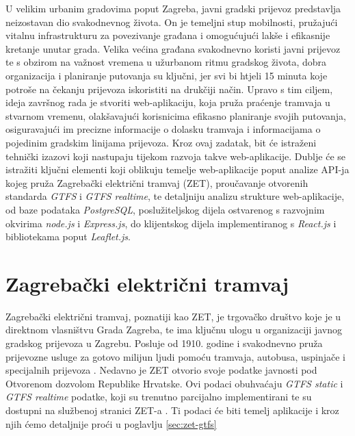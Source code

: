 \documentclass[zavrsnirad]{fer}
\begin{document}
U velikim urbanim gradovima poput Zagreba, javni gradski prijevoz predstavlja neizostavan dio svakodnevnog života. On je temeljni stup mobilnosti, pružajući vitalnu infrastrukturu za povezivanje građana i omogućujući lakše i efikasnije kretanje unutar grada. Velika većina građana svakodnevno koristi javni prijevoz te s obzirom na važnost vremena u užurbanom ritmu gradskog života, dobra organizacija i planiranje putovanja su ključni, jer svi bi htjeli 15 minuta koje potroše na čekanju prijevoza iskoristiti na drukčiji način. Upravo s tim ciljem, ideja završnog rada je stvoriti web-aplikaciju, koja pruža praćenje tramvaja u stvarnom vremenu, olakšavajući korisnicima efikasno planiranje svojih putovanja, osiguravajući im precizne informacije o dolasku tramvaja i informacijama o pojedinim gradskim linijama prijevoza. Kroz ovaj zadatak, bit će istraženi tehnički izazovi koji nastupaju tijekom razvoja takve web-aplikacije. Dublje će se istražiti ključni elementi koji oblikuju temelje web-aplikacije poput analize API-ja kojeg pruža Zagrebački električni tramvaj (ZET), proučavanje otvorenih standarda \textit{GTFS} i \textit{GTFS realtime}, te detaljniju analizu strukture web-aplikacije, od baze podataka \textit{PostgreSQL}, poslužiteljskog dijela ostvarenog s razvojnim okvirima \textit{node.js} i \textit{Express.js}, do klijentskog dijela implementiranog s \textit{React.js} i bibliotekama poput \textit{Leaflet.js}.







\chapter{Zagrebački električni tramvaj}
Zagrebački električni tramvaj, poznatiji kao ZET, je trgovačko društvo koje je u direktnom
vlasništvu Grada Zagreba, te ima ključnu ulogu u organizaciji javnog gradskog prijevoza u Zagrebu.
Posluje od 1910. godine i svakodnevno pruža prijevozne usluge za gotovo milijun ljudi pomoću
tramvaja, autobusa, uspinjače i specijalnih prijevoza \cite{ZET}.
Nedavno je ZET otvorio svoje podatke javnosti pod Otvorenom dozvolom Republike Hrvatske. Ovi podaci obuhvaćaju \textit{GTFS static} i \textit{GTFS realtime} podatke, koji su trenutno parcijalno implementirani te su dostupni na službenoj stranici ZET-a \cite{ZET-GTFS}.
Ti podaci će biti temelj aplikacije i kroz njih ćemo detaljnije proći u poglavlju \ref{sec:zet-gtfs}
\\\\
\end{document}
